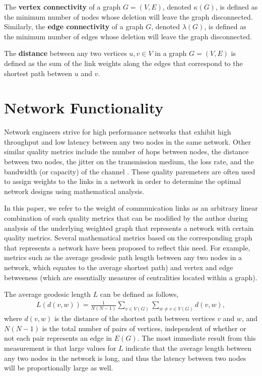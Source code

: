 \documentclass[11pt]{article}
\begin{document}
\begin{define}
The \textbf{vertex connectivity} of a graph $G = (V,E)$, denoted $\kappa(G)$, is defined as the minimum number of nodes whose deletion will leave the graph disconnected. Similarly, the \textbf{edge connectivity} of a graph $G$, denoted $\lambda(G)$, is defined as the minimum number of edges whose deletion will leave the graph disconnected.
\end{define}

\begin{define}
The \textbf{distance} between any two vertices $u, v \in V$ in a graph $G = (V,E)$ is defined as the sum of the link weights along the edges that correspond to the shortest path between $u$ and $v$.
\end{define}

\section{Network Functionality}
\label{NetworkFunctionality}

Network engineers strive for high performance networks that exhibit high throughput and low latency between any two nodes in the same network. Other similar quality metrics include the number of hops between nodes, the distance between two nodes, the jitter on the transmission medium, the loss rate, and the bandwidth (or capacity) of the channel \cite{LargeNetworkRobustness-PVM}. These quality paremeters are often used to assign weights to the links in a network in order to determine the optimal network designs using mathematical analysis. 


In this paper, we refer to the weight of communication links as an arbitrary linear combination of such quality metrics that can be modified by the author during analysis of the underlying weighted graph that represents a network with certain quality metrics. Several mathematical metrics based on the corresponding graph that represents a network have been proposed to reflect this need. For example, metrics such as the average geodesic path length between any two nodes in a network, which equates to the average shortest path) and vertex and edge betweeness (which are essentially measures of centralities located within a graph). 

The average geodesic length $L$ can be defined as follows,
\begin{eqnarray*}
L(d(v,w)) = \frac{1}{N(N-1)}\sum_{v \in V(G)}\sum_{w \not= v \in V(G)} d(v,w),
\end{eqnarray*}
where $d(v,w)$ is the distance of the shortest path between vertices $v$ and $w$, and $N(N-1)$ is the total number of pairs of vertices, independent of whether or not each pair represents an edge in $E(G)$. The most immediate result from this measurement is that large values for $L$ indicate that the average length between any two nodes in the network is long, and thus the latency between two nodes will be proportionally large as well. 
\end{document}
